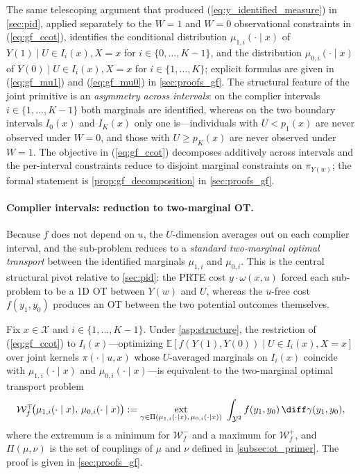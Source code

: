 The same telescoping argument that produced (\ref{eq:y_identified_measure}) in \cref{sec:pid}, applied separately to the $W=1$ and $W=0$ observational constraints in (\ref{eq:gf_ccot}), identifies the conditional distribution $\mu_{1, i}(\cdot \mid x)$ of $Y(1) \mid U \in I_i(x), X = x$ for $i \in \{0, \dots, K-1\}$, and the distribution $\mu_{0, i}(\cdot \mid x)$ of $Y(0) \mid U \in I_i(x), X = x$ for $i \in \{1, \dots, K\}$; explicit formulas are given in (\ref{eq:gf_mu1}) and (\ref{eq:gf_mu0}) in \cref{sec:proofs_gf}. The structural feature of the joint primitive is an \emph{asymmetry across intervals}: on the complier intervals $i \in \{1, \dots, K-1\}$ both marginals are identified, whereas on the two boundary intervals $I_0(x)$ and $I_K(x)$ only one is---individuals with $U < p_1(x)$ are never observed under $W = 0$, and those with $U \geqslant p_K(x)$ are never observed under $W = 1$. The objective in (\ref{eq:gf_ccot}) decomposes additively across intervals and the per-interval constraints reduce to disjoint marginal constraints on $\pi_{Y(w)}$; the formal statement is \cref{prop:gf_decomposition} in \cref{sec:proofs_gf}.

\paragraph{Complier intervals: reduction to two-marginal OT.} Because $f$ does not depend on $u$, the $U$-dimension averages out on each complier interval, and the sub-problem reduces to a \emph{standard two-marginal optimal transport} between the identified marginals $\mu_{1,i}$ and $\mu_{0,i}$. This is the central structural pivot relative to \cref{sec:pid}: the PRTE cost $y \cdot \omega(x, u)$ forced each sub-problem to be a 1D OT between $Y(w)$ and $U$, whereas the $u$-free cost $f(y_1, y_0)$ produces an OT between the two potential outcomes themselves.

\begin{theorem}\label{thm:gf_reduction}
    Fix $x \in \mathcal{X}$ and $i \in \{1, \dots, K-1\}$. Under \cref{asp:structure}, the restriction of (\ref{eq:gf_ccot}) to $I_i(x)$---optimizing $\mathbb{E}[f(Y(1), Y(0)) \mid U \in I_i(x), X = x]$ over joint kernels $\pi(\cdot \mid u, x)$ whose $U$-averaged marginals on $I_i(x)$ coincide with $\mu_{1,i}(\cdot \mid x)$ and $\mu_{0,i}(\cdot \mid x)$---is equivalent to the two-marginal optimal transport problem
    \begin{equation}\label{eq:gf_two_marginal}
        \mathcal{W}_f^{\mp}\!\bigl(\mu_{1, i}(\cdot \mid x),\, \mu_{0, i}(\cdot \mid x)\bigr) := \operatorname*{ext}_{\gamma \in \Pi(\mu_{1, i}(\cdot \mid x),\, \mu_{0, i}(\cdot \mid x))}\ \int_{\mathcal{Y}^2} f(y_1, y_0)\, \diff\gamma(y_1, y_0),
    \end{equation}
    where the extremum is a minimum for $\mathcal{W}_f^-$ and a maximum for $\mathcal{W}_f^+$, and $\Pi(\mu, \nu)$ is the set of couplings of $\mu$ and $\nu$ defined in \cref{subsec:ot_primer}. The proof is given in \cref{sec:proofs_gf}.
\end{theorem}

